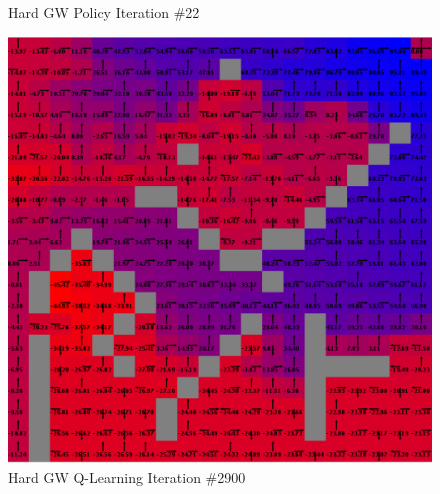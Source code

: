 \documentclass[h]{article}
\begin{document}
\begin{figure}[H]
      \caption*{Hard GW Policy Iteration \#22} 
   \endminipage\hfill
      \includegraphics[width=1\textwidth,keepaspectratio]{hard-q-2900.png} 
      \caption*{Hard GW Q-Learning Iteration \#2900} 
   \endminipage\hfill
\end{figure}
\end{document}
